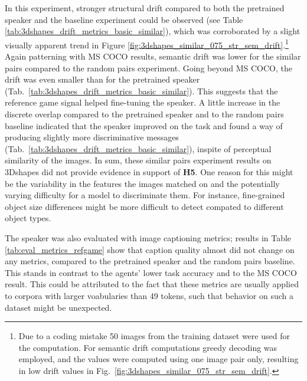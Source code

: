 In this experiment, stronger structural drift compared to both the pretrained speaker and the baseline experiment could be observed (see Table \ref{tab:3dshapes_drift_metrics_basic_similar}), which was corroborated by a slight visually apparent trend in Figure \ref{fig:3dshapes_similar_075_str_sem_drift}.\footnote{Due to a coding mistake 50 images from the training dataset were used for the computation. For semantic drift computations greedy decoding was employed, and the values were computed using one image pair only, resulting in low drift values in Fig.~\ref{fig:3dshapes_similar_075_str_sem_drift}.} Again patterning with MS COCO results, semantic drift was lower for the similar pairs compared to the random pairs experiment. Going beyond MS COCO, the drift was even smaller than for the pretrained speaker (Tab.~\ref{tab:3dshapes_drift_metrics_basic_similar}). This suggests that the reference game signal helped fine-tuning the speaker.
A little increase in the discrete overlap compared to the pretrained speaker and to the random pairs baseline indicated that the speaker improved on the task and found a way of producing slightly more discriminative messages (Tab.~\ref{tab:3dshapes_drift_metrics_basic_similar}), inspite of perceptual similarity of the images. In sum, these similar pairs experiment results on 3Dshapes did not provide evidence in support of \textbf{H5}. One reason for this might be the variability in the features the images matched on and the potentially varying difficulty for a model to discriminate them. For instance, fine-grained object size differences might be more difficult to detect compated to different object types.

The speaker was also evaluated with image captioning metrics; results in Table \ref{tab:eval_metrics_refgame} show that caption quality almost did not change on any metrics, compared to the pretrained speaker and the random pairs baseline. This stands in contrast to the agents' lower task accuracy and to the MS COCO result. This could be attributed to the fact that these metrics are usually applied to corpora with larger voabularies than 49 tokens, such that behavior on such a dataset might be unexpected.

